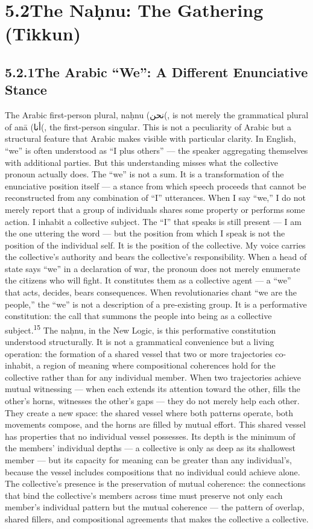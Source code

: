 \section{5.2\quad The Naḥnu: The Gathering (Tikkun)}

\subsection{5.2.1\quad The Arabic “We”: A Different Enunciative Stance}

The Arabic first-person plural, naḥnu (‫)نحن‬, is not merely the grammatical plural of anā (‫)أنا‬, the first-person singular. This is not a peculiarity of Arabic but a structural feature that Arabic makes visible with particular clarity. In English, “we” is often understood as “I plus others” — the speaker aggregating themselves with additional parties. But this understanding misses what the collective pronoun actually does. The “we” is not a sum. It is a transformation of the enunciative position itself — a stance from which speech proceeds that cannot be reconstructed from any combination of “I” utterances. When I say “we,” I do not merely report that a group of individuals shares some property or performs some action. I inhabit a collective subject. The “I” that speaks is still present — I am the one uttering the word — but the position from which I speak is not the position of the individual self. It is the position of the collective. My voice carries the collective’s authority and bears the collective’s responsibility. When a head of state says “we” in a declaration of war, the pronoun does not merely enumerate the citizens who will fight. It constitutes them as a collective agent — a “we” that acts, decides, bears consequences. When revolutionaries chant “we are the people,” the “we” is not a description of a pre-existing group. It is a performative constitution: the call that summons the people into being as a collective subject.\textsuperscript{15} The naḥnu, in the New Logic, is this performative constitution understood structurally. It is not a grammatical convenience but a living operation: the formation of a shared vessel that two or more trajectories co-inhabit, a region of meaning where compositional coherences hold for the collective rather than for any individual member. When two trajectories achieve mutual witnessing — when each extends its attention toward the other, fills the other’s horns, witnesses the other’s gaps — they do not merely help each other. They create a new space: the shared vessel where both patterns operate, both movements compose, and the horns are filled by mutual effort. This shared vessel has properties that no individual vessel possesses. Its depth is the minimum of the members’ individual depths — a collective is only as deep as its shallowest member — but its capacity for meaning can be greater than any individual’s, because the vessel includes compositions that no individual could achieve alone. The collective’s presence is the preservation of mutual coherence: the connections that bind the collective’s members across time must preserve not only each member’s individual pattern but the mutual coherence — the pattern of overlap, shared fillers, and compositional agreements that makes the collective a collective.

